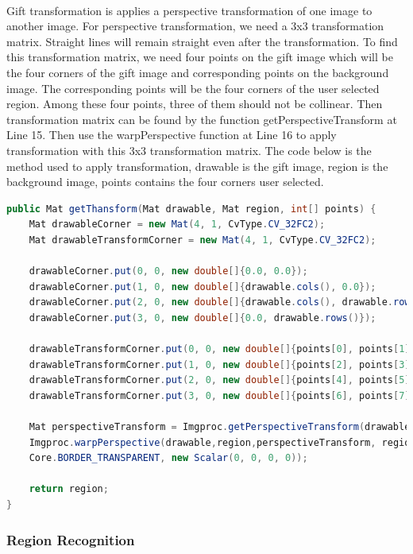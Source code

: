 \paragraph{} Gift transformation is applies a perspective transformation of one image to another image. For perspective transformation, we need a 3x3 transformation matrix. Straight lines will remain straight even after the transformation. To find this transformation matrix, we need four points on the gift image which will be the four corners of the gift image and corresponding points on the background image. The corresponding points will be the four corners of the user selected region.  Among these four points, three of them should not be collinear. Then transformation matrix can be found by the function getPerspectiveTransform at Line 15. Then use the warpPerspective function at Line 16  to apply transformation with this 3x3 transformation matrix. The code below is the method used to apply transformation, drawable is the gift image, region is the background image, points contains the four corners user selected.
\begin{lstlisting}[language=JAVA] 
public Mat getThansform(Mat drawable, Mat region, int[] points) {
    Mat drawableCorner = new Mat(4, 1, CvType.CV_32FC2);
    Mat drawableTransformCorner = new Mat(4, 1, CvType.CV_32FC2);

    drawableCorner.put(0, 0, new double[]{0.0, 0.0});
    drawableCorner.put(1, 0, new double[]{drawable.cols(), 0.0});
    drawableCorner.put(2, 0, new double[]{drawable.cols(), drawable.rows()});
    drawableCorner.put(3, 0, new double[]{0.0, drawable.rows()});

    drawableTransformCorner.put(0, 0, new double[]{points[0], points[1]});
    drawableTransformCorner.put(1, 0, new double[]{points[2], points[3]});
    drawableTransformCorner.put(2, 0, new double[]{points[4], points[5]});
    drawableTransformCorner.put(3, 0, new double[]{points[6], points[7]});

    Mat perspectiveTransform = Imgproc.getPerspectiveTransform(drawableCorner, drawableTransformCorner);
    Imgproc.warpPerspective(drawable,region,perspectiveTransform, region.size(), Imgproc.INTER_LINEAR,
    Core.BORDER_TRANSPARENT, new Scalar(0, 0, 0, 0));

    return region;
}
\end{lstlisting} 
\subsubsection{Region Recognition}
